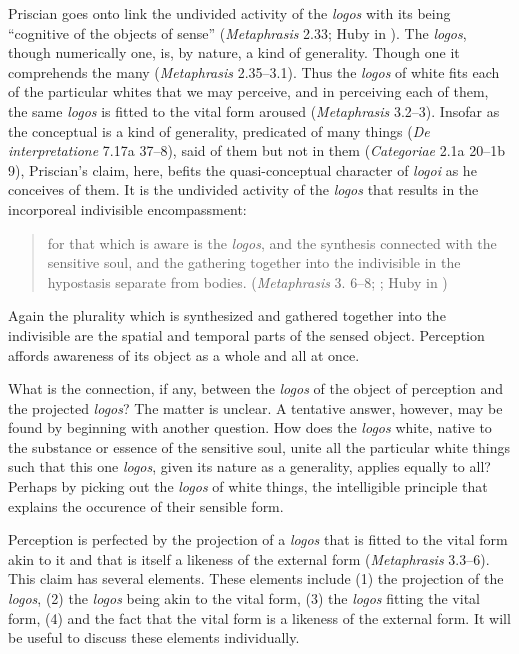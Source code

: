 \documentclass[12pt]{article}
\begin{document}
Priscian goes onto link the undivided activity of the \emph{logos} with its being ``cognitive of the objects of sense'' (\emph{Metaphrasis} 2.33; Huby in \citealt[10]{Sorabji:1997ly}). The \emph{logos}, though numerically one, is, by nature, a kind of generality. Though one it comprehends the many (\emph{Metaphrasis} 2.35--3.1). Thus the \emph{logos} of white fits each of the particular whites that we may perceive, and in perceiving each of them, the same \emph{logos} is fitted to the vital form aroused (\emph{Metaphrasis} 3.2--3). Insofar as the conceptual is a kind of generality, predicated of many things (\emph{De interpretatione} 7.17a 37--8), said of them but not in them (\emph{Categoriae} 2.1a 20--1b 9), Priscian's claim, here, befits the quasi-conceptual character of \emph{logoi} as he conceives of them. It is the undivided activity of the \emph{logos} that results in the incorporeal indivisible encompassment:
\begin{quote}
	for that which is aware is the \emph{logos}, and the synthesis connected with the sensitive soul, and the gathering together into the indivisible in the hypostasis separate from bodies. (\emph{Metaphrasis} 3. 6--8; ; Huby in \citealt[11]{Sorabji:1997ly})
\end{quote}
Again the plurality which is synthesized and gathered together into the indivisible are the spatial and temporal parts of the sensed object. Perception affords awareness of its object as a whole and all at once.

What is the connection, if any, between the \emph{logos} of the object of perception and the projected \emph{logos}? The matter is unclear. A tentative answer, however, may be found by beginning with another question. How does the \emph{logos} white, native to the substance or essence of the sensitive soul, unite all the particular white things such that this one \emph{logos}, given its nature as a generality, applies equally to all? Perhaps by picking out the \emph{logos} of white things, the intelligible principle that explains the occurence of their sensible form.

Perception is perfected by the projection of a \emph{logos} that is fitted to the vital form akin to it and that is itself a likeness of the external form (\emph{Metaphrasis} 3.3--6). This claim has several elements. These elements include (1) the projection of the \emph{logos}, (2) the \emph{logos} being akin to the vital form, (3) the \emph{logos} fitting the vital form, (4) and the fact that the vital form is a likeness of the external form. It will be useful to discuss these elements individually.
\end{document}
